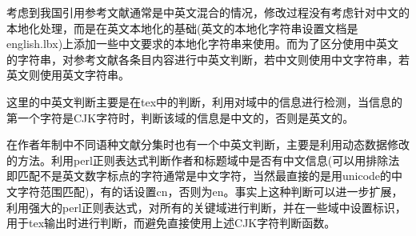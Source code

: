 考虑到我国引用参考文献通常是中英文混合的情况，修改过程没有考虑针对中文的本地化处理，而是在英文本地化的基础(英文的本地化字符串设置文档是english.lbx)上添加一些中文要求的本地化字符串来使用。而为了区分使用中英文的字符串，对参考文献各条目内容进行中英文判断，若中文则使用中文字符串，若英文则使用英文字符串。

这里的中英文判断主要是在tex中的判断，利用对域中的信息进行检测，当信息的第一个字符是CJK字符时，判断该域的信息是中文的，否则是英文的。

在作者年制中不同语种文献分集时也有一个中英文判断，主要是利用动态数据修改的方法。利用perl正则表达式判断作者和标题域中是否有中文信息(可以用排除法即匹配不是英文数字标点的字符通常是中文字符，当然最直接的是用unicode的中文字符范围匹配)，有的话设置cn，否则为en。事实上这种判断可以进一步扩展，利用强大的perl正则表达式，对所有的关键域进行判断，并在一些域中设置标识，用于tex输出时进行判断，而避免直接使用上述CJK字符判断函数。

